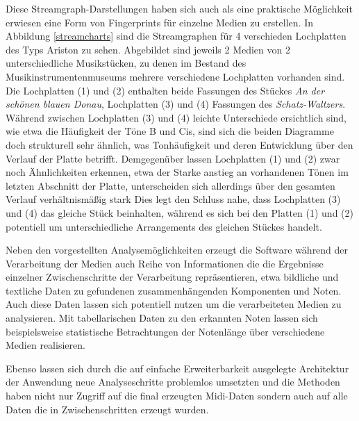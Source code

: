 Diese Streamgraph-Darstellungen haben sich auch als eine praktische Möglichkeit erwiesen eine Form von Fingerprints für einzelne Medien zu erstellen.
In Abbildung \ref{streamcharts} sind die Streamgraphen für 4 verschieden Lochplatten des Typs Ariston zu sehen.
Abgebildet sind jeweils 2 Medien von 2 unterschiedliche Musikstücken, zu denen im Bestand des Musikinstrumentenmuseums mehrere verschiedene Lochplatten vorhanden sind.
Die Lochplatten (1) und (2) enthalten beide Fassungen des Stückes \textit{An der schönen blauen Donau}, Lochplatten (3) und (4) Fassungen des \textit{Schatz-Waltzers}.
Während zwischen Lochplatten (3) und (4) leichte Unterschiede ersichtlich sind, wie etwa die Häufigkeit der Töne B und Cis, sind sich die beiden Diagramme doch strukturell sehr ähnlich, was Tonhäufigkeit und deren Entwicklung über den Verlauf der Platte betrifft.
Demgegenüber lassen Lochplatten (1) und (2) zwar noch Ähnlichkeiten erkennen, etwa der Starke anstieg an vorhandenen Tönen im letzten Abschnitt der Platte, unterscheiden sich allerdings über den gesamten Verlauf verhältnismäßig stark
Dies legt den Schluss nahe, dass Lochplatten (3) und (4) das gleiche Stück beinhalten, während es sich bei den Platten (1) und (2) potentiell um unterschiedliche Arrangements des gleichen Stückes handelt.

Neben den vorgestellten Analysemöglichkeiten erzeugt die Software während der Verarbeitung der Medien auch Reihe von Informationen die die Ergebnisse einzelner Zwischenschritte der Verarbeitung repräsentieren, etwa bildliche und textliche Daten zu gefundenen zusammenhängenden Komponenten und Noten.
Auch diese Daten lassen sich potentiell nutzen um die verarbeiteten Medien zu analysieren.
Mit tabellarischen Daten zu den erkannten Noten lassen sich beispielsweise statistische Betrachtungen der Notenlänge über verschiedene Medien realisieren.

Ebenso lassen sich durch die auf einfache Erweiterbarkeit ausgelegte Architektur der Anwendung neue Analyseschritte problemlos umsetzten und die Methoden haben nicht nur Zugriff auf die final erzeugten Midi-Daten sondern auch auf alle Daten die in Zwischenschritten erzeugt wurden.